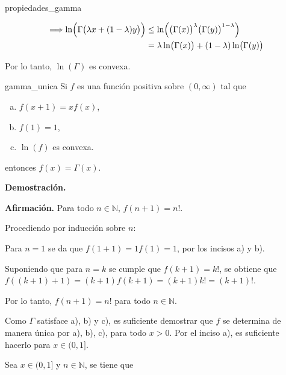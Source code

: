 \documentclass[fleqn]{article}
\newcounter{teore}
\newenvironment{teorema}[2]{\begin{teo}[breakable, pad at break = 5mm, leftrule = 0.7mm, rightrule = 0.7mm, right = 2mm, left = 2mm, enlarge bottom finally by = 3mm, fontupper = \setlength{\parskip}{2mm}, fontlower = \setlength{\parskip}{2mm}]{#1}{#2}}{\end{teo}}
\newcommand{\nat}{\mathbb{N}}
\begin{document}
\begin{teorema}{}{propiedades_gamma}
\begin{enumerate}[a)]
			\begin{align*}
				\Longrightarrow \ln \Bigl( \Gamma \bigl( \lambda x + (1 - \lambda)y \bigr) \Bigr) &\leq \ln \Bigl( \bigl( \Gamma(x) \bigr)^\lambda  \bigl( \Gamma(y) \bigr)^{1 - \lambda} \Bigr) \\
				&= \lambda \ln \bigl( \Gamma(x) \bigr) + (1 - \lambda) \ln \bigl( \Gamma(y) \bigr)
			\end{align*}

			Por lo tanto, $ \ln (\Gamma) $ es convexa.
		\end{enumerate}
	\end{teorema}

	\begin{teorema}{}{gamma_unica}
		Si $f$ es una función positiva sobre $ (0, \infty) $ tal que

		\begin{enumerate}[a)]
			\item $ f(x+1) = x f(x) $,
			\item $ f(1) = 1 $,
			\item $ \ln(f) $ es convexa.
		\end{enumerate}
		
		entonces $ f(x) = \Gamma(x) $.

		\tcblower

		\textbf{Demostración.}

		\textbf{Afirmación.} Para todo $ n \in \nat $, $ f(n+1) = n! $.

		\hfill \begin{minipage}{0.99\linewidth}
			\setlength{\parskip}{2mm}

			Procediendo por inducción sobre $ n $:

			Para $ n = 1 $ se da que $ f(1+1) = 1 f(1) = 1 $, por los incisos a) y b).

			Suponiendo que para $ n = k $ se cumple que $ f(k+1) = k! $, se obtiene que $ f((k+1)+1) = (k+1) f(k+1) = (k+1) k! = (k+1)! $.

			Por lo tanto, $ f(n+1) = n! $ para todo $ n \in \nat $.
		\end{minipage}

		Como $ \Gamma $ satisface a), b) y c), es suficiente demostrar que $ f $ se determina de manera única por a), b), c), para todo $ x > 0 $. Por el inciso a), es suficiente hacerlo para $ x \in (0, 1] $.

		Sea $ x \in (0, 1] $ y $ n \in \nat $, se tiene que


\end{teorema}
\end{document}
